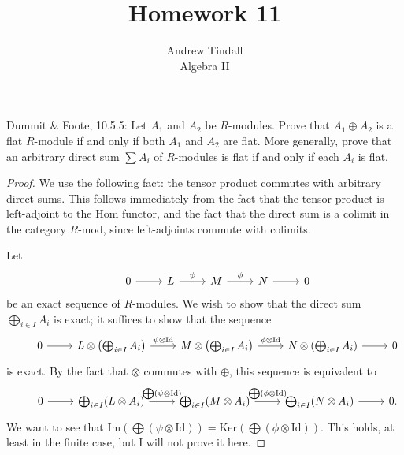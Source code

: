 \documentclass[12pt]{article}
\theoremstyle{definition}
\newenvironment{problem}[2][Problem]{\begin{trivlist}
\item[\hskip \labelsep {\bfseries #1}\hskip \labelsep {\bfseries #2.}]}{\end{trivlist}}
\begin{document}
 
 
\title{Homework 11}
\author{Andrew Tindall\\
Algebra II}
 
\maketitle
\begin{problem}{1}
	Dummit \& Foote, 10.5.5: Let $A_1$ and $A_2$ be $R$-modules. Prove that $A_1 \oplus A_2$ is a flat $R$-module if and only if both $A_1$ and $A_2$ are flat. More generally, prove that an arbitrary direct sum $\sum A_i$ of $R$-modules is flat if and only if each $A_i$ is flat.
	\begin{proof}
		We use the following fact: the tensor product commutes with arbitrary direct sums. This follows immediately from the fact that the tensor product is left-adjoint to the Hom functor, and the fact that the direct sum is a colimit in the category $R$-mod, since left-adjoints commute with colimits.
		\par Let 
		\[\begin{tikzcd}&0 \arrow[r,""]  &L \arrow[r, " \psi"]&M \arrow[r, " \phi"] &N \arrow[r,""] & 0\end{tikzcd}\]
		be an exact sequence of $R$-modules. We wish to show that the direct sum $\bigoplus_{i \in I} A_i$ is exact; it suffices to show that the sequence
		\[\begin{tikzcd}&0 \arrow[r] & L \otimes \left( \bigoplus_{i\in I}A_i \right) \arrow[r, "\psi \otimes \text{Id}"] &M \otimes \left( \bigoplus_{i\in I}A_i \right) \arrow[r, "\phi \otimes \text{Id}"] & N\otimes (\bigoplus_{i\in I} A_i) \arrow[r] &0 \end{tikzcd}\]
		is exact. By the fact that $\otimes$ commutes with $\oplus$, this sequence is equivalent to
		\[\begin{tikzcd}&0 \arrow[r] &\bigoplus_{i\in I}(L \otimes A_i) \arrow[r, "\bigoplus(\psi \otimes \text{Id})"] &\bigoplus_{i\in I}(M \otimes A_i)\arrow[r, "\bigoplus(\phi \otimes \text{Id})"]&\bigoplus_{i\in I}(N \otimes A_i)\arrow[r]&0.\end{tikzcd}\]
		We want to see that $\text{Im}(\bigoplus(\psi \otimes \text{Id})) = \text{Ker}(\bigoplus(\phi \otimes \text{Id}))$. This holds, at least in the finite case, but I will not prove it here.	
		\end{proof}
\end{problem}
\end{document}
